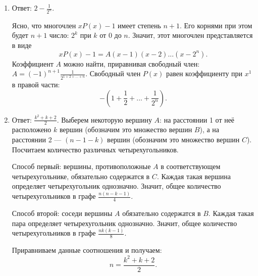 \begin{enumerate}
\item Ответ: $2 - \frac{1}{2^n}$.

Ясно, что многочлен $x P(x) - 1$ имеет степень $n+1$. Его корнями при этом будет $n+1$ число: $2^k$ при $k$ от $0$ до $n$. Значит, этот многочлен представляется в виде 
$$x P(x) - 1 = A (x - 1) (x - 2) ... (x - 2^n).$$
Коэффициент $A$ можно найти, приравнивая свободный член: $A = (-1)^{n+1} \frac{1}{2^{1+2+...+n}}$. Свободный член $P(x)$ равен коэффициенту при $x^1$ в правой части:
$$ - \left(1 + \frac{1}{2} + ... + \frac{1}{2^n} \right).$$

\item Ответ: $\frac{k^2 + k + 2}{2}$. Выберем некоторую вершину $A$: на расстоянии 1 от неё расположено $k$ вершин (обозначим это множество вершин $B$), а на расстоянии 2 ---  $(n - 1 - k)$ вершин (обозначим это множество вершин $C$). Посчитаем количество различных четырехугольников. 

Способ первый: вершины, противоположные $A$ в соответствующем четырехугольнике, обязательно содержатся в $C$. Каждая такая вершина определяет четырехугольник однозначно. Значит, общее количество четырехугольников в графе $\frac{n(n-k-1)}{4}$.

Способ второй: соседи вершины $A$ обязательно содержатся в $B$. Каждая такая пара определяет четырехугольник однозначно. Значит, общее количество четырехугольников в графе $\frac{nk(k-1)}{8}$.

Приравниваем данные соотношения и получаем:
$$n = \frac{k^2 + k + 2}{2}.$$

\end{enumerate}
